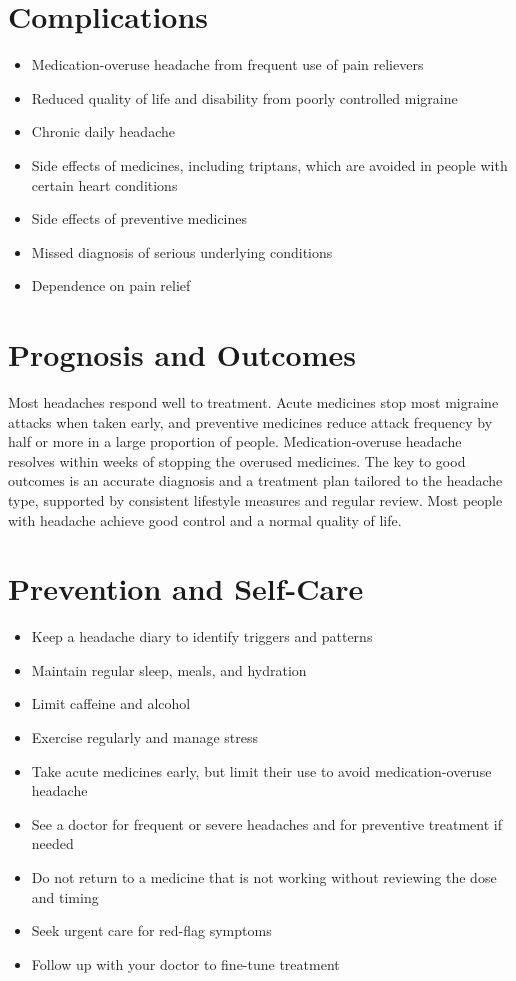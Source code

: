 \section*{Complications}
\begin{itemize}
    \item Medication-overuse headache from frequent use of pain relievers
    \item Reduced quality of life and disability from poorly controlled migraine
    \item Chronic daily headache
    \item Side effects of medicines, including triptans, which are avoided in people with certain heart conditions
    \item Side effects of preventive medicines
    \item Missed diagnosis of serious underlying conditions
    \item Dependence on pain relief
\end{itemize}

\section*{Prognosis and Outcomes}
Most headaches respond well to treatment. Acute medicines stop most migraine attacks when taken early, and preventive medicines reduce attack frequency by half or more in a large proportion of people. Medication-overuse headache resolves within weeks of stopping the overused medicines. The key to good outcomes is an accurate diagnosis and a treatment plan tailored to the headache type, supported by consistent lifestyle measures and regular review. Most people with headache achieve good control and a normal quality of life.

\section*{Prevention and Self-Care}
\begin{itemize}
    \item Keep a headache diary to identify triggers and patterns
    \item Maintain regular sleep, meals, and hydration
    \item Limit caffeine and alcohol
    \item Exercise regularly and manage stress
    \item Take acute medicines early, but limit their use to avoid medication-overuse headache
    \item See a doctor for frequent or severe headaches and for preventive treatment if needed
    \item Do not return to a medicine that is not working without reviewing the dose and timing
    \item Seek urgent care for red-flag symptoms
    \item Follow up with your doctor to fine-tune treatment
\end{itemize}

